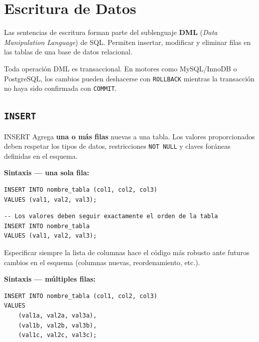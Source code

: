 \newpage
\section{Escritura de Datos}

Las sentencias de escritura forman parte del sublenguaje \textbf{DML}
(\textit{Data Manipulation Language}) de SQL. Permiten insertar, modificar y
eliminar filas en las tablas de una base de datos relacional.

\begin{nota}
  Toda operación DML es transaccional. En motores como MySQL/InnoDB o PostgreSQL,
  los cambios pueden deshacerse con \texttt{ROLLBACK} mientras la transacción
  no haya sido confirmada con \texttt{COMMIT}.
\end{nota}

\subsection{\texttt{INSERT}}

\begin{definicion}{INSERT}
  Agrega \textbf{una o más filas} nuevas a una tabla. Los valores proporcionados
  deben respetar los tipos de datos, restricciones \texttt{NOT NULL} y claves
  foráneas definidas en el esquema.
\end{definicion}

\textbf{Sintaxis — una sola fila:}

\begin{lstlisting}[style=sql, caption={INSERT de una fila con columnas explícitas}]
INSERT INTO nombre_tabla (col1, col2, col3)
VALUES (val1, val2, val3);
\end{lstlisting}

\begin{lstlisting}[style=sql, caption={INSERT sin lista de columnas (no recomendado)}]
-- Los valores deben seguir exactamente el orden de la tabla
INSERT INTO nombre_tabla
VALUES (val1, val2, val3);
\end{lstlisting}

\begin{nota}
  Especificar siempre la lista de columnas hace el código más robusto ante futuros
  cambios en el esquema (columnas nuevas, reordenamiento, etc.).
\end{nota}

\textbf{Sintaxis — múltiples filas:}

\begin{lstlisting}[style=sql, caption={INSERT de varias filas en una sola sentencia}]
INSERT INTO nombre_tabla (col1, col2, col3)
VALUES
    (val1a, val2a, val3a),
    (val1b, val2b, val3b),
    (val1c, val2c, val3c);
\end{lstlisting}

